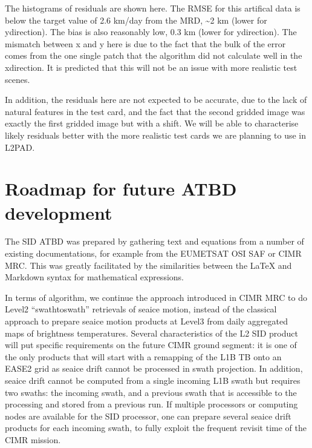 \documentclass[letterpaper,10pt,english]{jupyterBook}
\begin{document}
\sphinxAtStartPar
The histograms of residuals are shown here. The RMSE for this artifical data is below the target value of 2.6 km/day from the MRD, \textasciitilde{}2 km (lower for y\sphinxhyphen{}direction). The bias is also reasonably low, \sphinxhyphen{}0.3 km (lower for y\sphinxhyphen{}direction). The mismatch between x and y here is due to the fact that the bulk of the error comes from the one single patch that the algorithm did not calculate well in the x\sphinxhyphen{}direction. It is predicted that this will not be an issue with more realistic test scenes.

\sphinxAtStartPar
In addition, the residuals here are not expected to be accurate, due to the lack of natural features in the test card, and the fact that the second gridded image was exactly the first gridded image but with a shift. We will be able to characterise likely residuals better with the more realistic test cards we are planning to use in L2PAD.

\sphinxstepscope


\chapter{Roadmap for future ATBD development}
\label{\detokenize{roadmap_for_future_atbd_developments:roadmap-for-future-atbd-development}}\label{\detokenize{roadmap_for_future_atbd_developments::doc}}
\sphinxAtStartPar
The SID ATBD was prepared by gathering text and equations from a number of existing documentations, for example from the EUMETSAT OSI SAF or CIMR MRC. This was greatly facilitated by the similarities between the LaTeX and Markdown syntax for mathematical expressions.

\sphinxAtStartPar
In terms of algorithm, we continue the approach introduced in CIMR MRC to do Level\sphinxhyphen{}2 “swath\sphinxhyphen{}to\sphinxhyphen{}swath” retrievals of sea\sphinxhyphen{}ice motion, instead of the classical approach to prepare sea\sphinxhyphen{}ice motion products at Level\sphinxhyphen{}3 from daily aggregated maps of brightness temperatures. Several characteristics of the L2 SID product will put specific requirements on the future CIMR ground segment: it is one of the only products that will start with a remapping of the L1B TB onto an EASE2 grid as sea\sphinxhyphen{}ice drift cannot be processed in swath projection. In addition, sea\sphinxhyphen{}ice drift cannot be computed from a single incoming L1B swath but requires two swaths: the incoming swath, and a previous swath that is accessible to the processing and stored from a previous run. If multiple processors or computing nodes are available for the SID processor, one can prepare several sea\sphinxhyphen{}ice drift products for each incoming swath, to fully exploit the frequent revisit time of the CIMR mission.
\end{document}
